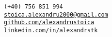 \begin{center}
\tt{(+40) 756 851 994} \\
\href{mailto:stoica.alexandru2000@gmail.com}
    {stoica.alexandru2000@gmail.com} \\
\href{https://github.com/alexandrustoica}
    {github.com/alexandrustoica} \\  
\href{https://www.linkedin.com/in/alexandrstk}
    {linkedin.com/in/alexandrstk}
\end{center}
